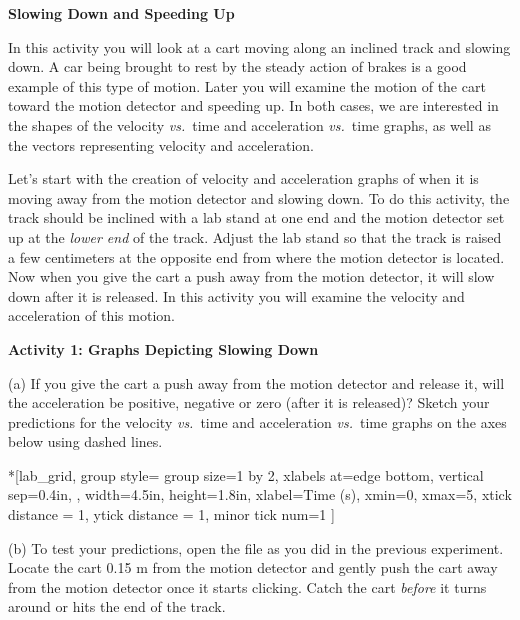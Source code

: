 \medskip
\textbf{Slowing Down and Speeding Up }

In this activity you will look at a cart moving along an inclined track and
slowing down. A car being brought to rest by the steady action of brakes is
a good example of this type of motion. Later you will examine the motion of
the cart toward the motion detector and speeding up. In both cases, we are interested
in the shapes of the velocity \textit{vs.}~time and acceleration \textit{vs.}~time graphs, as
well as the vectors representing velocity and acceleration. 

Let's start with the creation of velocity and acceleration graphs of when it
is moving away from the motion detector and slowing down. To do this activity,
the track should be inclined with a lab stand at one end and the motion detector set up at the \textit{lower end} of the track. Adjust the lab stand so that the track is raised a few centimeters at the opposite end from where the motion detector is located. Now when you give the cart a push away from the motion detector, it will slow down after it is released. In this activity you will examine the velocity and acceleration of this motion.

\pagebreak[2]
\textbf{Activity 1: Graphs Depicting Slowing Down} 

(a) If you give the cart a push away from the motion detector and release it,
will the acceleration be positive, negative or zero (after it is released)?
Sketch your predictions for the velocity \textit{vs.}~time and acceleration \textit{vs.}~time
graphs on the axes below using dashed lines.

\begin{lab_groupplot}*{}[lab_grid,
	group style={
		group size=1 by 2,
		xlabels at=edge bottom,
		vertical sep=0.4in,
		},
	width=4.5in,  height=1.8in,
	xlabel=Time (s),
	xmin=0, xmax=5,
	xtick distance = 1, 
	ytick distance = 1, 
	minor tick num=1
	]
\nextgroupplot[
	ymin=-1,ymax=1, 
	ylabel={Velocity (m/s)},
	]
\nextgroupplot[
	ymin=-1,ymax=1, 
	ylabel={Acceleration (m/s$^2$)},
	]
\end{lab_groupplot}

(b) To test your predictions, open the  file as you did in the previous experiment. Locate the cart 0.15 m from the motion detector and gently push the cart away from the motion detector once it starts clicking. Catch the cart \textit{before} it turns around or hits the end of the track.

